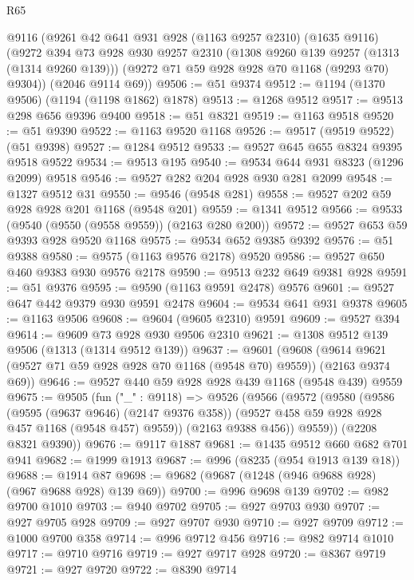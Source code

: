 \begin{lexlean}{R65}
\begin{coremodule}
    @9116
    (@9261
      @42
      @641
      @931
      @928
      (@1163 @9257 @2310)
      (@1635 @9116)
      (@9272
        @394
        @73
        @928
        @930
        @9257
        @2310
        (@1308 @9260 @139 @9257 (@1313 (@1314 @9260 @139)))
        (@9272 @71 @59 @928 @928 @70 @1168 (@9293 @70) @9304))
      (@2046 @9114 @69))
@9506 := @51 @9374
@9512 := @1194 (@1370 @9506) (@1194 (@1198 @1862) @1878)
@9513 := @1268 @9512
@9517 := @9513 @298 @656 @9396 @9400
@9518 := @51 @8321
@9519 := @1163 @9518
@9520 := @51 @9390
@9522 := @1163 @9520 @1168
@9526 := @9517 (@9519 @9522) (@51 @9398)
@9527 := @1284 @9512
@9533 := @9527 @645 @655 @8324 @9395 @9518 @9522
@9534 := @9513 @195
@9540 := @9534 @644 @931 @8323 (@1296 @2099) @9518
@9546 := @9527 @282 @204 @928 @930 @281 @2099
@9548 := @1327 @9512 @31
@9550 := @9546 (@9548 @281)
@9558 := @9527 @202 @59 @928 @928 @201 @1168 (@9548 @201)
@9559 := @1341 @9512
@9566 := @9533 (@9540 (@9550 (@9558 @9559)) (@2163 @280 @200))
@9572 := @9527 @653 @59 @9393 @928 @9520 @1168
@9575 := @9534 @652 @9385 @9392
@9576 := @51 @9388
@9580 := @9575 (@1163 @9576 @2178) @9520
@9586 := @9527 @650 @460 @9383 @930 @9576 @2178
@9590 := @9513 @232 @649 @9381 @928
@9591 := @51 @9376
@9595 := @9590 (@1163 @9591 @2478) @9576
@9601 := @9527 @647 @442 @9379 @930 @9591 @2478
@9604 := @9534 @641 @931 @9378
@9605 := @1163 @9506
@9608 := @9604 (@9605 @2310) @9591
@9609 := @9527 @394
@9614 := @9609 @73 @928 @930 @9506 @2310
@9621 := @1308 @9512 @139 @9506 (@1313 (@1314 @9512 @139))
@9637 := @9601
    (@9608 (@9614 @9621 (@9527 @71 @59 @928 @928 @70 @1168 (@9548 @70) @9559)) (@2163 @9374 @69))
@9646 := @9527 @440 @59 @928 @928 @439 @1168 (@9548 @439) @9559
@9675 := @9505
    (fun ("_" : @9118) =>
    @9526
      (@9566
        (@9572
          (@9580
            (@9586
              (@9595 (@9637 @9646) (@2147 @9376 @358))
              (@9527 @458 @59 @928 @928 @457 @1168 (@9548 @457) @9559))
            (@2163 @9388 @456))
          @9559))
      (@2208 @8321 @9390))
@9676 := @9117 @1887
@9681 := @1435 @9512 @660 @682 @701 @941
@9682 := @1999 @1913
@9687 := @996 (@8235 (@954 @1913 @139 @18))
@9688 := @1914 @87
@9698 := @9682 (@9687 (@1248 (@946 @9688 @928) (@967 @9688 @928) @139 @69))
@9700 := @996 @9698 @139
@9702 := @982 @9700 @1010
@9703 := @940 @9702
@9705 := @927 @9703 @930
@9707 := @927 @9705 @928
@9709 := @927 @9707 @930
@9710 := @927 @9709
@9712 := @1000 @9700 @358
@9714 := @996 @9712 @456
@9716 := @982 @9714 @1010
@9717 := @9710 @9716
@9719 := @927 @9717 @928
@9720 := @8367 @9719
@9721 := @927 @9720
@9722 := @8390 @9714

\end{coremodule}
\end{lexlean}
